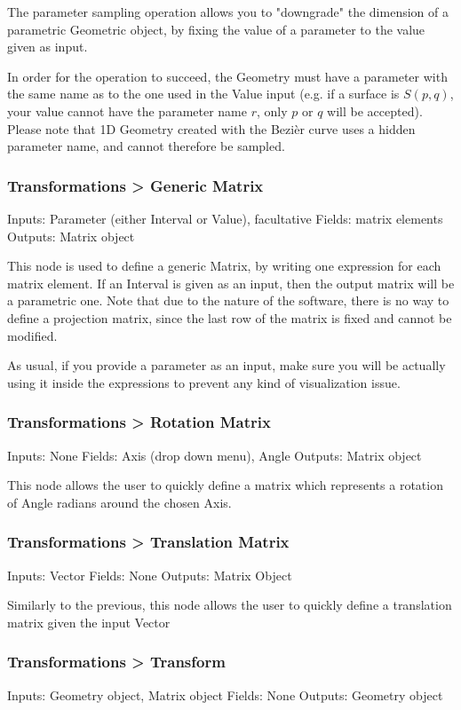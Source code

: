 The parameter sampling operation allows you to "downgrade" the dimension of a parametric
Geometric object, by fixing the value of a parameter to the value given as input.

In order for the operation to succeed, the Geometry must have a parameter with the same name
as to the one used in the Value input (e.g. if a surface is $S(p, q)$, your value cannot
have the parameter name $r$, only $p$ or $q$ will be accepted). Please note that 1D Geometry created with the Bezi\`er
curve uses a hidden parameter name, and cannot therefore be sampled.

\subsubsection{Transformations > Generic Matrix}
Inputs: Parameter (either Interval or Value), facultative
Fields: matrix elements
Outputs: Matrix object

This node is used to define a generic Matrix, by writing one expression for each
matrix element. If an Interval is given as an input, then the output matrix will be
a parametric one.
Note that due to the nature of the software, there is no way to define a projection matrix,
since the last row of the matrix is fixed and cannot be modified.

As usual, if you provide a parameter as an input, make sure you
will be actually using it inside the expressions to prevent any kind of visualization
issue.

\subsubsection{Transformations > Rotation Matrix}
Inputs: None
Fields: Axis (drop down menu), Angle
Outputs: Matrix object

This node allows the user to quickly define a matrix which represents a rotation
of Angle radians around the chosen Axis.

\subsubsection{Transformations > Translation Matrix}
Inputs: Vector
Fields: None
Outputs: Matrix Object

Similarly to the previous, this node allows the user to quickly define a translation
matrix given the input Vector

\subsubsection{Transformations > Transform}
Inputs: Geometry object, Matrix object
Fields: None
Outputs: Geometry object

